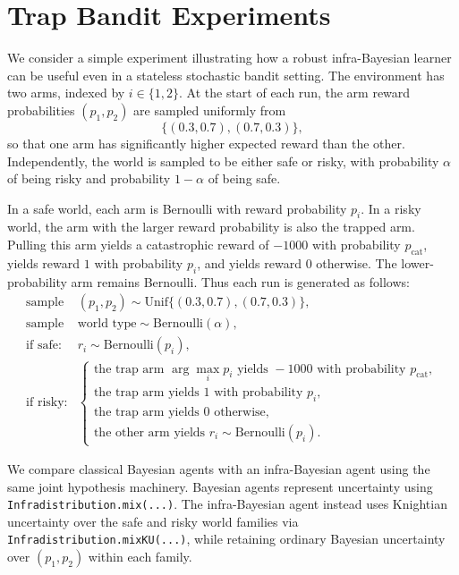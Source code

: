 \section{Trap Bandit Experiments}
\label{section:trap-bandits}

We consider a simple experiment illustrating how a robust infra-Bayesian learner can be useful even in a stateless stochastic bandit setting. The environment has two arms, indexed by \(i \in \{1,2\}\). At the start of each run, the arm reward probabilities \((p_1,p_2)\) are sampled uniformly from
\[
    \{(0.3,0.7), (0.7,0.3)\},
\]
so that one arm has significantly higher expected reward than the other. Independently, the world is sampled to be either safe or risky, with probability \(\alpha\) of being risky and probability \(1-\alpha\) of being safe.

In a safe world, each arm is Bernoulli with reward probability \(p_i\). In a risky world, the arm with the larger reward probability is also the trapped arm. Pulling this arm yields a catastrophic reward of \(-1000\) with probability \(p_{\mathrm{cat}}\), yields reward \(1\) with probability \(p_i\), and yields reward \(0\) otherwise. The lower-probability arm remains Bernoulli. Thus each run is generated as follows:
\[
\begin{array}{ll}
\text{sample} & (p_1,p_2) \sim \mathrm{Unif}\{(0.3,0.7),(0.7,0.3)\},\\
\text{sample} & \text{world type} \sim \mathrm{Bernoulli}(\alpha),\\[2mm]
\text{if safe:} & r_i \sim \mathrm{Bernoulli}(p_i),\\[1mm]
\text{if risky:} &
\begin{cases}
\text{the trap arm } \arg\max_i p_i \text{ yields } -1000 \text{ with probability } p_{\mathrm{cat}},\\
\text{the trap arm yields } 1 \text{ with probability } p_i,\\
\text{the trap arm yields } 0 \text{ otherwise},\\
\text{the other arm yields } r_i \sim \mathrm{Bernoulli}(p_i).
\end{cases}
\end{array}
\]

We compare classical Bayesian agents with an infra-Bayesian agent using the same joint hypothesis machinery. Bayesian agents represent uncertainty using \texttt{Infradistribution.mix(...)}. The infra-Bayesian agent instead uses Knightian uncertainty over the safe and risky world families via \texttt{Infradistribution.mixKU(...)}, while retaining ordinary Bayesian uncertainty over \((p_1,p_2)\) within each family.

